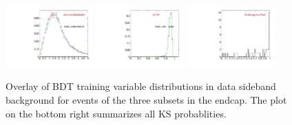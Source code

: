 \begin{figure}
  \includegraphics[width=0.3\textwidth]{Figures/VariablesComparison/Data_endcaps_figs_3h/delta3dErr}
  \includegraphics[width=0.3\textwidth]{Figures/VariablesComparison/Data_endcaps_figs_3h/pvw8}
  \includegraphics[width=0.3\textwidth]{Figures/VariablesComparison/Data_endcaps_figs_3h/KS}
  \caption{Overlay of BDT training variable distributions in data sideband background for events of the three subsets in the endcap. The plot on the bottom right summarizes all KS probablities.}
  \label{fig:Data_endcaps_figs_3h}
\end{figure}


